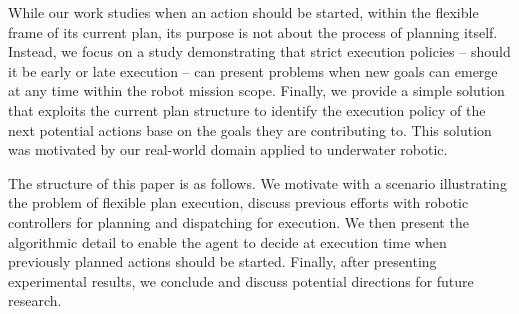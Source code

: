 While our work studies when an action should be started, within the
flexible frame of its current plan, its purpose is not about the
process of planning itself. Instead, we focus on a study demonstrating
that strict execution policies -- should it be early or late execution
-- can present problems when new goals can emerge at any time within
the robot mission scope. Finally, we provide a simple solution that
exploits the current plan structure to identify the execution policy
of the next potential actions base on the goals they are contributing
to. This solution was motivated by our real-world domain applied to
underwater robotic.




The structure of this paper is as follows. We motivate with a
scenario illustrating the problem of flexible plan execution, discuss
previous efforts with robotic controllers for planning and dispatching
for execution. We then present the algorithmic detail to enable the
agent to decide at execution time when previously planned actions 
should be started. Finally, after presenting experimental results, 
we conclude and discuss potential directions for future research.

